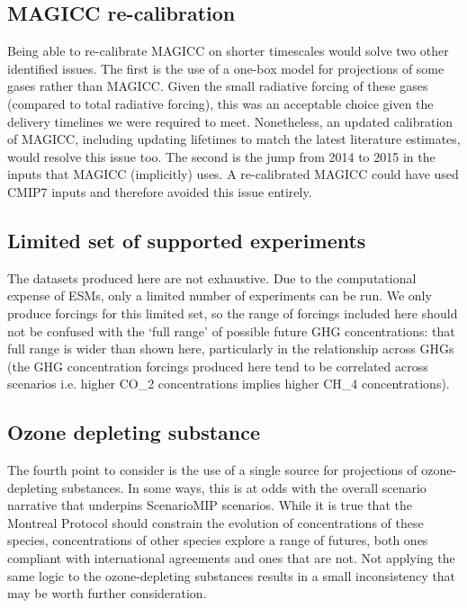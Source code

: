\subsection{MAGICC re-calibration}
\label{ssec:discussion-magicc-recalibration}

Being able to re-calibrate MAGICC on shorter timescales would solve two other identified issues.
The first is the use of a one-box model for projections of some gases rather than MAGICC.
Given the small radiative forcing of these gases (compared to total radiative forcing),
this was an acceptable choice given the delivery timelines we were required to meet.
Nonetheless, an updated calibration of MAGICC, including updating lifetimes to match the latest literature estimates,
would resolve this issue too.
The second is the jump from 2014 to 2015 in the inputs that MAGICC (implicitly) uses.
A re-calibrated MAGICC could have used CMIP7 inputs and therefore avoided this issue entirely.

\subsection{Limited set of supported experiments}
\label{ssec:discussion-experiment-set}

The datasets produced here are not exhaustive.
Due to the computational expense of ESMs, only a limited number of experiments can be run.
We only produce forcings for this limited set,
so the range of forcings included here should not be confused with the `full range' of possible future GHG concentrations:
that full range is wider than shown here, particularly in the relationship across GHGs
(the GHG concentration forcings produced here tend to be correlated across scenarios
i.e. higher CO_2 concentrations implies higher CH_4 concentrations).


\subsection{Ozone depleting substance}
\label{ssec:discussion-ods}

The fourth point to consider is the use of a single source for projections of ozone-depleting substances.
In some ways, this is at odds with the overall scenario narrative that underpins ScenarioMIP scenarios.
While it is true that the Montreal Protocol should constrain the evolution of concentrations of these species,
concentrations of other species explore a range of futures,
both ones compliant with international agreements and ones that are not.
Not applying the same logic to the ozone-depleting substances results in a small inconsistency
that may be worth further consideration.

